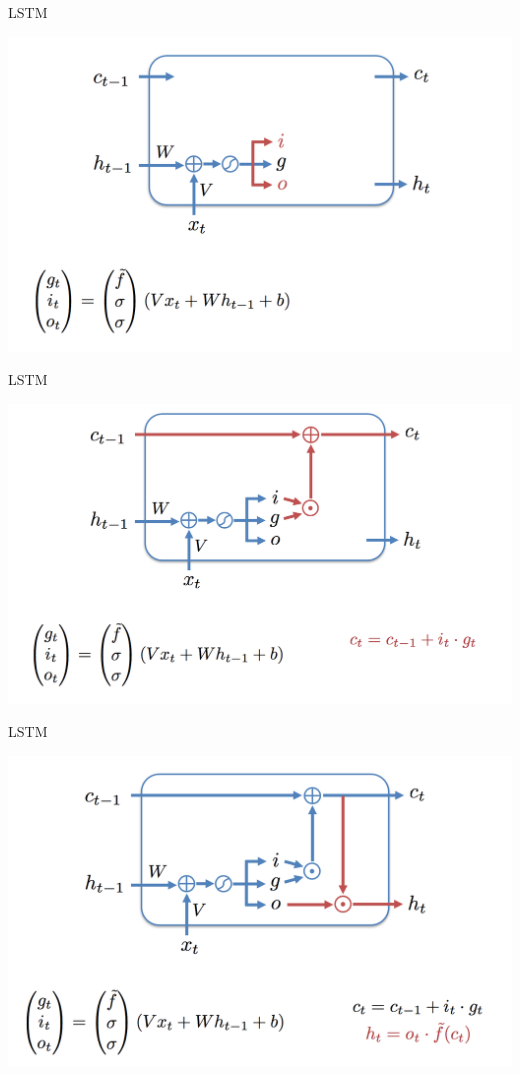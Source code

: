 \documentclass[notes,12pt, aspectratio=169]{beamer}
\begin{document}
\begin{frame}{LSTM}
\begin{center}
	\includegraphics[width=.8\linewidth]{lstm4.png}
\end{center}
\end{frame}


\begin{frame}{LSTM}
\begin{center}
	\includegraphics[width=.8\linewidth]{lstm5.png}
\end{center}
\end{frame}


\begin{frame}{LSTM}
\begin{center}
	\includegraphics[width=.8\linewidth]{lstm6.png}
\end{center}
\end{frame}
\end{document}
